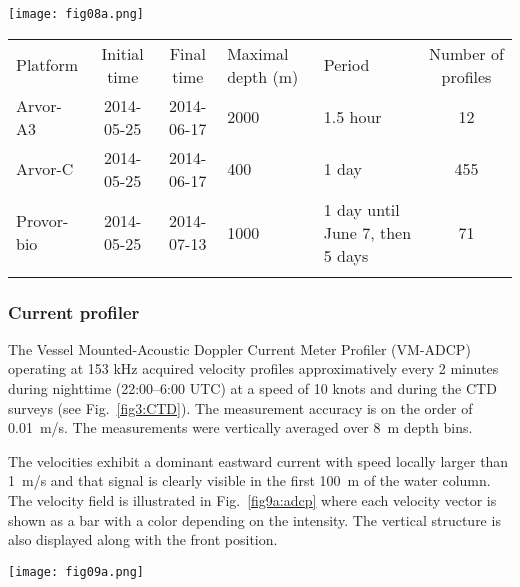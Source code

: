 \documentclass[essd]{copernicus}
\begin{document}
\begin{figure*}[h]
\texttt{[image: fig08a.png]}
\caption{Profiling floats trajectories (top-left panel) and salinity from May 25 to June 15, 2014. \label{fig8:argofloats}}
\end{figure*}


\begin{table*}[htpb]
\caption{Characteristics of the profiling floats.\label{tab:argofloats}}
\begin{tabular}{lccllc}
\tophline
Platform 			& Initial time	& Final time	& Maximal depth (m)		& Period & Number of profiles \\
\middlehline
Arvor-A3			& 2014-05-25	& 2014-06-17	& 2000		& 1.5 hour 	& 12 							\\ 
Arvor-C				& 2014-05-25	& 2014-06-17	& 400		& 1 day		& 455				\\ 
Provor-bio			& 2014-05-25	& 2014-07-13	& 1000		& 1 day until June 7, then 5 days	& 71	\\ 
\bottomhline
\end{tabular}
\end{table*}

\subsubsection{Current profiler\label{sec:adcp}}

The Vessel Mounted-Acoustic Doppler Current Meter Profiler (VM-ADCP) operating at 153 kHz acquired velocity profiles approximatively every 2 minutes during nighttime (22:00--6:00 UTC) at a speed of 10 knots and during the CTD surveys (see Fig.~\ref{fig3:CTD}). The measurement accuracy is on the order of 0.01~m/s. The measurements were vertically averaged over 8~m depth bins.

The velocities exhibit a dominant eastward current with speed locally larger than 1~m/s and that signal is clearly visible in the first 100~m of the water column. The velocity field is illustrated in Fig.~\ref{fig9a:adcp} where each velocity vector is shown as a bar with a color depending on the intensity. The vertical structure is also displayed along with the front position.

\begin{figure*}[h]
\texttt{[image: fig09a.png]}
\caption{Velocity field obtained with the ADCP at a 40~m depth (left panel) and sections of zonal velocity on May 26 (S1) and 27 (S2). The locations of the sections are indicated by dashed rectangles on the map. Only data with a quality flag equal to 1 (good data) are represented\label{fig9a:adcp}}
\end{figure*}
\end{document}
